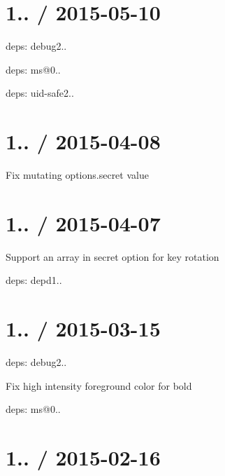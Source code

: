 \section*{1.. / 2015-\/05-\/10 }


\begin{DoxyItemize}
\item deps\+: debug2..
\begin{DoxyItemize}
\item deps\+: ms@0..
\end{DoxyItemize}
\item deps\+: uid-\/safe2..
\end{DoxyItemize}

\section*{1.. / 2015-\/04-\/08 }


\begin{DoxyItemize}
\item Fix mutating {\ttfamily options.\+secret} value
\end{DoxyItemize}

\section*{1.. / 2015-\/04-\/07 }


\begin{DoxyItemize}
\item Support an array in {\ttfamily secret} option for key rotation
\item deps\+: depd1..
\end{DoxyItemize}

\section*{1.. / 2015-\/03-\/15 }


\begin{DoxyItemize}
\item deps\+: debug2..
\begin{DoxyItemize}
\item Fix high intensity foreground color for bold
\item deps\+: ms@0..
\end{DoxyItemize}
\end{DoxyItemize}

\section*{1.. / 2015-\/02-\/16 }


